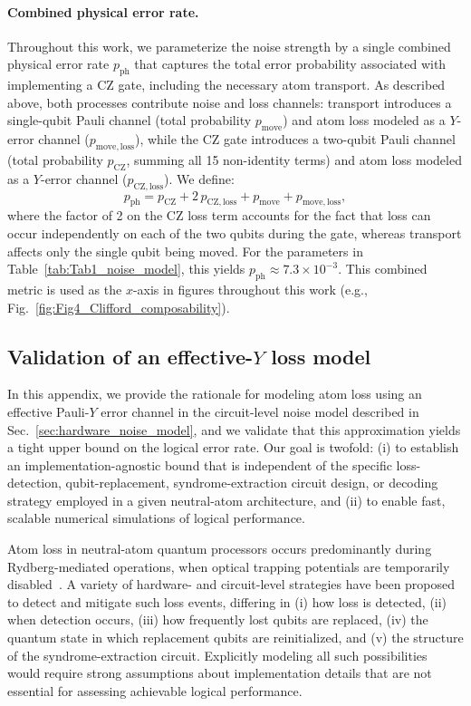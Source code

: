 \documentclass[aps, prx, reprint, superscriptaddress, longbibliography, floatfix]{revtex4-2}
\begin{document}
\paragraph{Combined physical error rate.} 
Throughout this work, we parameterize the noise strength by a single combined physical error rate $p_{\mathrm{ph}}$ that captures the total error probability associated with implementing a CZ gate, including the necessary atom transport. As described above, both processes contribute noise and loss channels: transport introduces a single-qubit Pauli channel (total probability $p_{\mathrm{move}}$) and atom loss modeled as a $Y$-error channel ($p_{\mathrm{move,loss}}$), while the CZ gate introduces a two-qubit Pauli channel (total probability $p_{\mathrm{CZ}}$, summing all 15 non-identity terms) and atom loss modeled as a $Y$-error channel ($p_{\mathrm{CZ,loss}}$). We define:
\begin{equation}
    p_{\mathrm{ph}} = p_{\mathrm{CZ}} + 2 \, p_{\mathrm{CZ,loss}} + p_{\mathrm{move}} + p_{\mathrm{move,loss}},
    \label{eq:physical_error_rate}
\end{equation}
where the factor of 2 on the CZ loss term accounts for the fact that loss can occur independently on each of the two qubits during the gate, whereas transport affects only the single qubit being moved. For the parameters in Table~\ref{tab:Tab1_noise_model}, this yields $p_{\mathrm{ph}} \approx 7.3 \times 10^{-3}$. This combined metric is used as the $x$-axis in figures throughout this work (e.g., Fig.~\ref{fig:Fig4_Clifford_composability}).


\subsection{Validation of an effective-\texorpdfstring{$Y$}{Y} loss model}
\label{sec:loss_bound_validation}

In this appendix, we provide the rationale for modeling atom loss using an effective Pauli-$Y$ error channel in the circuit-level noise model described in Sec.~\ref{sec:hardware_noise_model}, and we validate that this approximation yields a tight upper bound on the logical error rate. Our goal is twofold: (i) to establish an implementation-agnostic bound that is independent of the specific loss-detection, qubit-replacement, syndrome-extraction circuit design, or decoding strategy employed in a given neutral-atom architecture, and (ii) to enable fast, scalable numerical simulations of logical performance.

Atom loss in neutral-atom quantum processors occurs predominantly during Rydberg-mediated operations, when optical trapping potentials are temporarily disabled~\cite{Evered2023, Bluvstein2024}. A variety of hardware- and circuit-level strategies have been proposed to detect and mitigate such loss events, differing in (i) how loss is detected, (ii) when detection occurs, (iii) how frequently lost qubits are replaced, (iv) the quantum state in which replacement qubits are reinitialized, and (v) the structure of the syndrome-extraction circuit. Explicitly modeling all such possibilities would require strong assumptions about implementation details that are not essential for assessing achievable logical performance.
\end{document}
